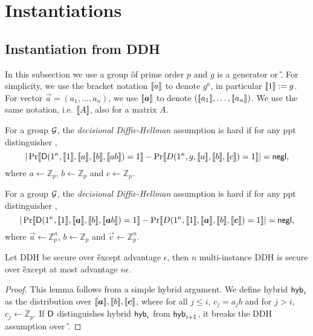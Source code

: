 \section{Instantiations}\label{sec:inst}
\newcommand{\Z}{\ensuremath{\mathbb Z}\xspace}

\subsection{Instantiation from DDH}

In this subsection we use a group \G of prime order $p$ and $g$ is a generator or \G. For simplicity, we use the bracket notation $\llbracket a\rrbracket$ to denote $g^a$, in particular $\llbracket 1\rrbracket:=g$. For vector $\vec{a}=(a_1,\ldots,a_n)$, we use $\lb \vec{a}\rb$ to denote $(\llbracket a_1\rrbracket,\ldots,\llbracket a_n\rrbracket)$. We use the same notation, i.e. $\llbracket A\rrbracket$, also for a matrix $A$.

\begin{definition}
For a group $\mathcal{G}$, the \emph{decisional Diffie-Hellman} assumption is hard if for any ppt distinguisher \D,
$$
|\Pr\llbracket \mathsf D(1^\kappa,\llbracket 1\rrbracket,\llbracket a\rrbracket,\llbracket b\rrbracket,\llbracket ab\rrbracket)=1\rrbracket-\Pr\llbracket D(1^\kappa,g,\llbracket a\rrbracket,\llbracket b\rrbracket,\llbracket c\rrbracket)=1\rrbracket|=\mathsf{negl},
$$
where $a\leftarrow\Z_p$, $b\leftarrow\Z_p$ and $c\leftarrow\Z_p$.
\end{definition}

\begin{definition}
For a group $\mathcal{G}$, the \emph{decisional Diffie-Hellman} assumption is hard if for any ppt distinguisher \D,
$$
|\Pr\lb \D(1^\sec,\lb 1\rb,\lb \vec{a}\rb,\lb b\rb,\lb \vec{a}b\rb)=1\rb-\Pr\lb D(1^\sec,\lb 1\rb,\lb \vec{a}\rb,\lb b\rb,\lb \vec{c}\rb)=1\rb|=\negl,
$$
where $\vec{a}\leftarrow\Z_p^n$, $b\leftarrow\Z_p$ and $\vec{c}\leftarrow\Z_p^n$.
\end{definition}

\begin{lemma}\label{lem:DHuniform}
Let DDH be secure over \G except advantage $\epsilon$, then $n$ multi-instance DDH is secure over \G except at most advantage $n\epsilon$.
\end{lemma}

\begin{proof}
This lemma follows from a simple hybrid argument. We define hybrid $\mathsf{hyb}_i$ as the distribution over $\lb \vec{a}\rb,\lb b\rb,\lb \vec{c}\rb$, where for all $j\leq i$, $c_j=a_jb$ and for $j>i$, $c_j\leftarrow\Z_p$. If $\mathsf D$ distinguishes hybrid $\mathsf{hyb}_i$ from $\mathsf{hyb}_{i+1}$, it breaks the DDH assumption over \G.
\end{proof}

